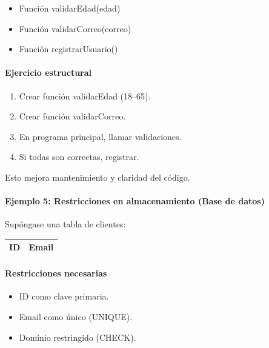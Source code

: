 \documentclass[12pt,twoside]{book}
\begin{document}
						\begin{itemize}
							\item Función validarEdad(edad)
							\item Función validarCorreo(correo)
							\item Función registrarUsuario()
						\end{itemize}
						
						\paragraph{Ejercicio estructural}
						
						\begin{enumerate}
							\item Crear función validarEdad (18--65).
							\item Crear función validarCorreo.
							\item En programa principal, llamar validaciones.
							\item Si todas son correctas, registrar.
						\end{enumerate}
						
						\noindent
						Esto mejora mantenimiento y claridad del código.
						
						\paragraph{Ejemplo 5: Restricciones en almacenamiento (Base de datos)}
						
						\noindent
						Supóngase una tabla de clientes:
						
						\begin{center}
							\begin{tabular}{|c|c|}
								\hline
								ID & Email \\
								\hline
							\end{tabular}
						\end{center}
						
						\paragraph{Restricciones necesarias}
						
						\begin{itemize}
							\item ID como clave primaria.
							\item Email como único (UNIQUE).
							\item Dominio restringido (CHECK).
						\end{itemize}
						
\end{document}
